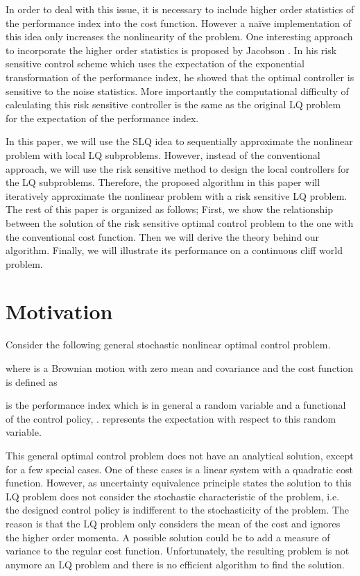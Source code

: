 \documentclass[letterpaper, 10 pt, conference]{ieeeconf}
\begin{document}
In order to deal with this issue, it is necessary to include higher order
statistics of the performance index into the cost function. However a na\"ive
implementation of this idea only increases the nonlinearity of the problem.
One interesting approach to incorporate the higher order statistics is proposed
by Jacobson \cite{jacobson73}. In his risk sensitive control scheme which uses the
expectation of the exponential transformation of the performance index, he showed
that the optimal controller is sensitive to the noise statistics. More
importantly the computational difficulty of calculating this risk sensitive
controller is the same as the original LQ problem for the expectation of the
performance index.

In this paper, we will use the SLQ idea to sequentially approximate the nonlinear
problem with local LQ subproblems. However, instead of the conventional approach,
we will use the risk sensitive method to design the local controllers for the LQ
subproblems. Therefore, the proposed algorithm in this paper will iteratively
approximate the nonlinear problem with a risk sensitive LQ problem. The rest of
this paper is organized as follows; First, we show the relationship between the
solution of the risk sensitive optimal control problem to the one with the
conventional cost function. Then we will derive the theory behind our algorithm.
Finally, we will illustrate its performance on a continuous cliff world problem.


\section{Motivation}
Consider the following general stochastic nonlinear optimal control problem.

where  is a Brownian motion with zero mean and covariance  and
the cost function is defined as

 is the performance index which is in general a random variable
and a functional of the control policy, .  represents the
expectation with respect to this random variable.

This general optimal control problem does not have an analytical
solution, except for a few special cases. One of these cases is a linear system
with a quadratic cost function. However, as uncertainty equivalence principle
states the solution to this LQ problem does not consider the
stochastic characteristic of the problem, i.e. the designed control policy is
indifferent to the stochasticity of the problem. The reason is that the LQ
problem only considers the mean of the cost and ignores the higher order
momenta. A possible solution could be to add a measure of variance to the
regular cost function. Unfortunately, the resulting problem is not anymore an LQ
problem and there is no efficient algorithm to find the solution.
\end{document}
